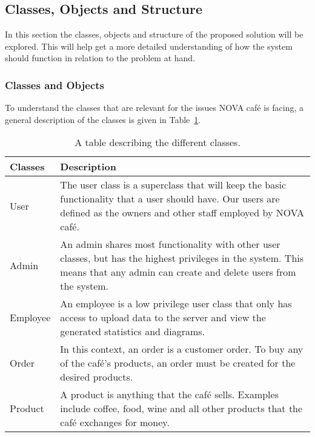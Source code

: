 \subsection{Classes, Objects and Structure}\label{subsec:classes-objects-and-structure}

In this section the classes, objects and structure of the proposed solution will be explored.
This will help get a more detailed understanding of how the system should function in relation to the problem at hand.

\subsubsection{Classes and Objects}\label{subsubsec:classes-and-objects}

To understand the classes that are relevant for the issues NOVA café is facing,
a general description of the classes is given in Table~\ref{tab:class-table}.

\begin{table}[H]
    \begin{tabularx}{\textwidth}{ l X }
        \toprule
        \textbf{Classes}
        & \textbf{Description}
        \\ \midrule
        User
        & The user class is a superclass that will keep the
        basic functionality that a user should have.
        Our users are defined as the owners and other staff employed by NOVA café.
        \\ \midrule
        Admin
        & An admin shares most functionality with other user classes,
        but has the highest privileges in the system.
        This means that any admin can create and delete users from the system.
        \\ \midrule
        Employee
        & An employee is a low privilege user class
        that only has access to upload data to the server and
        view the generated statistics and diagrams.
        \\ \midrule
        Order
        & In this context, an order is a customer order.
        To buy any of the café's products, an order must be created
        for the desired products.
        \\ \midrule
        Product
        & A product is anything that the café sells.
        Examples include coffee, food, wine and all other products that
        the café exchanges for money.
        \\ \bottomrule
    \end{tabularx}
    \caption{A table describing the different classes.
    }\label{tab:class-table}
\end{table}

